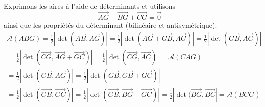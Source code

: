 Exprimons les aires à l'aide de déterminants et utilisons 
\begin{displaymath}
 \overrightarrow{AG}+\overrightarrow{BG}+\overrightarrow{CG}=\overrightarrow{0}
\end{displaymath}
ainsi que les propriétés du déterminant (bilinéaire et antisymétrique):
\begin{multline*}
 \mathcal A(ABG) = \frac{1}{2}|\det(\overrightarrow{AB},\overrightarrow{AG})| 
= \frac{1}{2}|\det(\overrightarrow{AG}+\overrightarrow{GB},\overrightarrow{AG})|
= \frac{1}{2}|\det(\overrightarrow{GB},\overrightarrow{AG})| \\
= \frac{1}{2}|\det(\overrightarrow{CG},\overrightarrow{AG}+\overrightarrow{GC})|
= \frac{1}{2}|\det(\overrightarrow{CG},\overrightarrow{AC})|= \mathcal A(CAG)\\
= \frac{1}{2}|\det(\overrightarrow{GB},\overrightarrow{AG})|
= \frac{1}{2}|\det(\overrightarrow{GB},\overrightarrow{GB}+\overrightarrow{GC})|\\
= \frac{1}{2}|\det(\overrightarrow{GB},\overrightarrow{GC})|
= \frac{1}{2}|\det(\overrightarrow{GB},\overrightarrow{BG}+\overrightarrow{GC})|
= \frac{1}{2}|\det(\overrightarrow{BG},\overrightarrow{BC}|
= \mathcal A (BCG)
\end{multline*}
